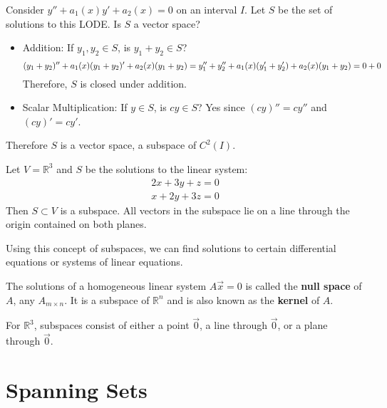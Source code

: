 \documentclass[../main.tex]{subfiles}
\begin{document}
\begin{example}[]
    Consider \( y''+a_1(x)y' + a_2(x) = 0 \) on an interval \( I \). Let \( S \) be the set of solutions to this LODE.
    Is \( S \) a vector space?
    \begin{itemize}
        \item Addition: If \( y_1,y_2 \in S \), is \( y_1+y_2 \in S \)?
            \[ (y_1+y_2)''+a_1(x)(y_1+y_2)' + a_2(x)(y_1+y_2) \\
            = y_1''+y_2'' + a_1(x)(y_1'+y_2') + a_2(x)(y_1+y_2) \\
            = 0+0 \]
            Therefore, \( S \) is closed under addition.
        \item Scalar Multiplication: If \( y \in S \), is \( cy \in S \)?
            Yes since \( (cy)'' = cy'' \) and \( (cy)' = cy' \).
    \end{itemize}
    Therefore \( S \) is a vector space, a subspace of \( C^2(I) \).
\end{example}

\begin{example}[]
    Let \( V = \mathbb{R}^3 \) and \( S \) be the solutions to the linear system:
    \begin{align*}
        2x + 3y + z = 0 \\
        x + 2y + 3z = 0
    \end{align*}
    Then \( S \subset V \) is a subspace.
    All vectors in the subspace lie on a line through the origin contained on both planes.
\end{example}

Using this concept of subspaces, we can find solutions to certain differential equations or systems of linear equations.

\begin{definition}
    The solutions of a homogeneous linear system \( A \vec{x} = 0 \) is called the \textbf{null space} of \( A \), any \( A_{m \times n} \).
    It is a subspace of \( \mathbb{R}^n \) and is also known as the \textbf{kernel} of \( A \).
\end{definition}

For \( \mathbb{R}^3 \), subspaces consist of either a point {\( \vec{0} \)}, a line through \( \vec{0} \), or a plane through \( \vec{0} \).


\section{Spanning Sets}
\end{document}
